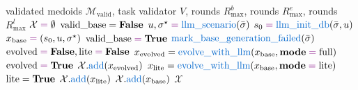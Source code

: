 \begin{algorithm}[h]
\caption{Base task generation and evolution (Section~\ref{sub:task_generation}).}
\label{alg:task-generation}
\small
\begin{algorithmic}[1]

\Require validated medoids $\mathcal{M}_{\text{valid}}$, task validator $V$, rounds $R^b_{\max}$, rounds $R^e_{\max}$, rounds $R^l_{\max}$
\State $\mathcal{X} \op{=} \emptyset$
    \State $\text{valid\_base} = \textbf{False}$
     
        \State $u, \sigma^\star \op{=} \fn{llm\_scenario}(\bar\sigma)$
        \State $s_0 \op{=} \fn{llm\_init\_db}(\bar\sigma, u)$
        \State $x_{\text{base}} \op{=} (s_0, u, \sigma^\star)$
         
        \State $\text{valid\_base} \op{=} \kw{True} $ 
        \State {}
        \EndIf
    \EndFor
    \State $\fn{mark\_base\_generation\_failed}(\bar\sigma)$ 
    \State {}
    \EndIf
    \Statex
    \State $\text{evolved} \op{=} \kw{False}, \text{lite} \op{=} \kw{False}$
     
        \State $x_{\text{evolved}} = \fn{evolve\_with\_llm}(x_{\text{base}}, \kw{mode} \op{=} \text{full})$
            \State $\text{evolved} \op{=} \kw{True}$
            \State {}
        \EndIf
    \EndFor
        \State $\mathcal{X}.\fn{add}(x_{\text{evolved}})$
        \State {}
    \EndIf
     
        \State $x_{\text{lite}} = \fn{evolve\_with\_llm}(x_{\text{base}}, \kw{mode}\op{=}\text{lite})$
            \State $\text{lite} = \textbf{True}$
            \State {}
        \EndIf
    \EndFor
        \State $\mathcal{X}.\fn{add}(x_{\text{lite}})$
        \State {}
    \EndIf
    \State $\mathcal{X}.\fn{add}(x_{\text{base}})$ 
\EndFor
\State {} $\mathcal{X}$

\end{algorithmic}
\end{algorithm}
